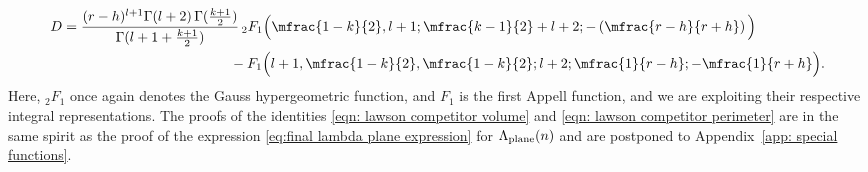 \documentclass[10pt,reqno]{amsart}
\numberwithin{equation}{section}
\theoremstyle{definition}
\begin{document}
{{\begin{align}
\begin{split}
\end{split}
\end{align}
\begin{align}
\begin{split}
\label{eqn: term D} 
    D & =  \frac{(r-h)^{l+1} \Gamma(l+2)\, \Gamma(\frac{k+1}{2})}{\Gamma(l+1+\frac{k+1}{2})} \, {}_2F_1\Big(\mfrac{1-k}{2}, l+1; \mfrac{k-1}{2} + l+2; -\left(\mfrac{r-h}{r+h}\right) \Big)\\
    &
 \qquad \qquad \qquad\qquad\qquad \qquad- F_1\Big(l+1 , \mfrac{1-k}{2},  \mfrac{1-k}{2}; l+2; \mfrac{1}{r-h} ; -\mfrac{1}{r+h}\Big).
\end{split}
\end{align}
Here, ${}_2F_1$ once again denotes the Gauss hypergeometric function, and $F_1$ is the first Appell function, {and we are exploiting their respective integral representations}.
The proofs of the identities \eqref{eqn: lawson competitor volume} and \eqref{eqn: lawson competitor perimeter} are in the same spirit as the proof of the expression \eqref{eq:final lambda plane expression} for $\Lambda_{\rm plane}(n)$ and are postponed to Appendix~\ref{app: special functions}.








}}
\end{document}
